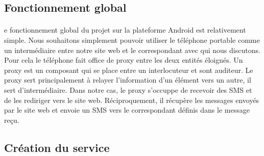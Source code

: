 \subsection{Fonctionnement global}


\paragraph{}
e fonctionnement global du projet sur la plateforme Android est relativement simple. Nous souhaitons
simplement pouvoir utiliser le téléphone portable comme un intermédiaire entre notre site web et le 
correspondant avec qui nous discutons. Pour cela le téléphone fait office de proxy entre les deux 
entités éloignés. Un proxy est un composant qui se place entre un interlocuteur et sont auditeur. Le 
proxy sert principalement à relayer l'information d'un élément vers un autre, il sert d'intermédiaire.
Dans notre cas, le proxy s'occuppe de recevoir des SMS et de les rediriger vers le site web. 
Réciproquement, il récupère les messages envoyés par le site web et envoie un SMS vers le correspondant
définis dans le message reçu.




\subsection{Création du service}



